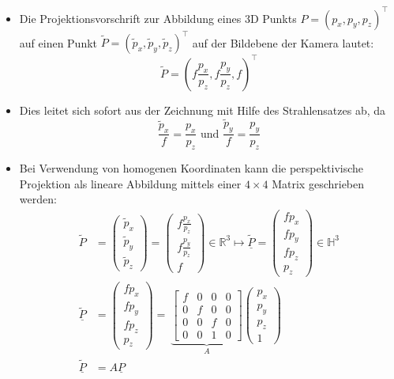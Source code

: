 \documentclass{scrartcl}
\begin{document}
\begin{itemize}
	\item Die Projektionsvorschrift zur Abbildung eines 3D Punkts $P = (p_x, p_y, p_z)^\top$ auf einen Punkt $\widetilde{P} = (\widetilde{p}_x, \widetilde{p}_y, \widetilde{p}_z)^\top$ auf der Bildebene der Kamera lautet:
	\begin{equation}
		\widetilde{P} = (f \frac{p_x}{p_z}, f \frac{p_y}{p_z}, f)^\top
	\end{equation}
	\item Dies leitet sich sofort aus der Zeichnung mit Hilfe des Strahlensatzes ab, da
	\begin{equation}
		\frac{\widetilde{p}_x}{f} = \frac{p_x}{p_z} \text{ und }  \frac{\widetilde{p}_y}{f} = \frac{p_y}{p_z}
	\end{equation}
	\item Bei Verwendung von homogenen Koordinaten kann die perspektivische Projektion als lineare Abbildung mittels einer $4 \times 4$ Matrix geschrieben werden: \\
	\begin{equation}
		\begin{split}
			\widetilde{P} &= \begin{pmatrix}
			\widetilde{p}_x \\
			\widetilde{p}_y \\
			\widetilde{p}_z
			\end{pmatrix} = \begin{pmatrix}
			f \frac{p_x}{p_z} \\
			f \frac{p_y}{p_z} \\
			f
			\end{pmatrix} \in \mathbb{R}^3 \mapsto \underline{\widetilde{P}} = \begin{pmatrix}
			f p_x \\
			f p_y \\
			f p_z \\
			p_z
			\end{pmatrix} \in \mathbb{H}^3 \\
			\underline{\widetilde{P}} &= \begin{pmatrix}
			f p_x \\
			f p_y \\
			f p_z \\
			p_z
			\end{pmatrix} = \ \underbrace{\begin{bmatrix}
			f & 0 & 0 & 0 \\
			0 & f & 0 & 0 \\
			0 & 0 & f & 0 \\
			0 & 0 & 1 & 0
			\end{bmatrix}}_A \begin{pmatrix}
			p_x \\
			p_y \\
			p_z \\
			1
			\end{pmatrix} \\
			\underline{\widetilde{P}} &= A \underline{P}
		\end{split}
	\end{equation}
\end{itemize}
\end{document}
